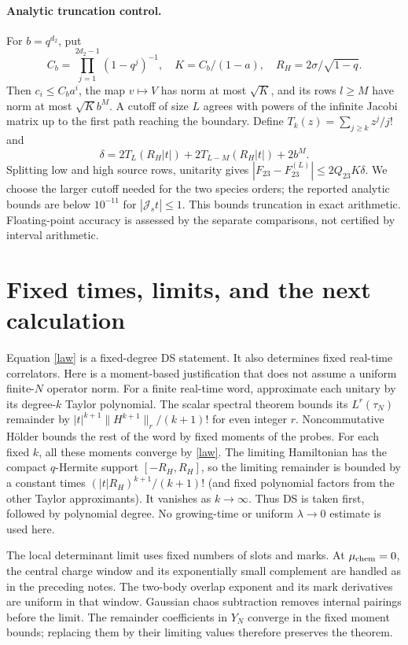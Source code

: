 \documentclass[11pt,a4paper]{article}
\newcommand{\Js}{\mathcal J_s}
\newcommand{\sig}{\sigma}
\begin{document}
\paragraph{Analytic truncation control.}
For $b=q^{d_2}$, put
\[
 C_b=\prod_{j=1}^{2d_2-1}(1-q^j)^{-1},\quad K=C_b/(1-a),\quad
 R_H=2\sig/\sqrt{1-q}.
\]
Then $c_i\le C_ba^i$, the map $v\mapsto V$ has norm at most $\sqrt K$,
and its rows $l\ge M$ have norm at most $\sqrt K b^M$. A cutoff of size
$L$ agrees with powers of the infinite Jacobi matrix up to the first
path reaching the boundary. Define $T_k(z)=\sum_{j\ge k}z^j/j!$ and
\[
 \delta=2T_L(R_H|t|)+2T_{L-M}(R_H|t|)+2b^M.
\]
Splitting low and high source rows, unitarity gives
$|F_{23}-F_{23}^{(L)}|\le2Q_{23}K\delta$.
We choose the larger cutoff needed for the two species orders; the
reported analytic bounds are below $10^{-11}$ for $|\Js t|\le1$.
This bounds truncation in exact arithmetic. Floating-point accuracy is
assessed by the separate comparisons, not certified by interval arithmetic.

\newpage
\appendix
\section{Fixed times, limits, and the next calculation}
Equation \eqref{law} is a fixed-degree DS statement. It also determines
fixed real-time correlators. Here is a moment-based justification that
does not assume a uniform finite-$N$ operator norm. For a finite real-time
word, approximate each unitary by its degree-$k$ Taylor polynomial.
The scalar spectral theorem bounds its $L^r(\tau_N)$ remainder by
$|t|^{k+1}\|H^{k+1}\|_r/(k+1)!$ for even integer $r$. Noncommutative
H\"older bounds the rest of the word by fixed moments of the probes.
For each fixed $k$, all these moments converge by \eqref{law}. The
limiting Hamiltonian has the compact $q$-Hermite support
$[-R_H,R_H]$, so the limiting remainder is bounded by a constant times
$(|t|R_H)^{k+1}/(k+1)!$ (and fixed polynomial factors from the other
Taylor approximants). It vanishes as $k\to\infty$. Thus DS is taken
first, followed by polynomial degree. No growing-time or uniform
$\lambda\to0$ estimate is used here.

The local determinant limit uses fixed numbers of slots and marks.
At $\mu_{\rm chem}=0$, the central charge window and its exponentially
small complement are handled as in the preceding notes. The two-body
overlap exponent and its mark derivatives are uniform in that window.
Gaussian chaos subtraction removes internal pairings before the limit.
The remainder coefficients in $Y_N$ converge in the fixed moment bounds;
replacing them by their limiting values therefore preserves the theorem.
\end{document}
